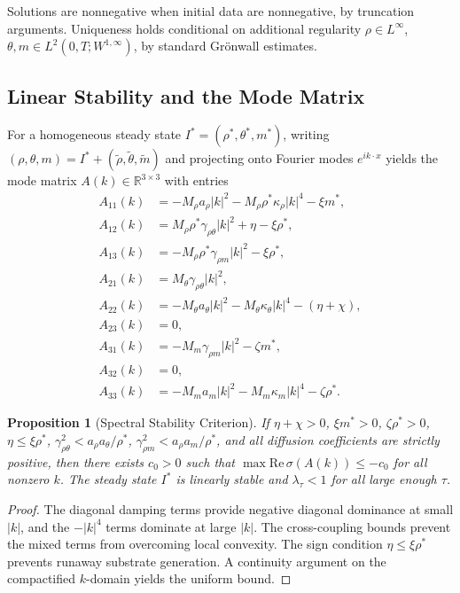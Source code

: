 \documentclass[10pt,twocolumn]{article}
\theoremstyle{plain}
\newtheorem{proposition}[theorem]{Proposition}
\theoremstyle{definition}
\theoremstyle{remark}
\begin{document}
Solutions are nonnegative when initial data are nonnegative, by
truncation arguments. Uniqueness holds conditional on additional
regularity $\rho \in L^\infty$, $\theta, m \in L^2(0,T;W^{1,\infty})$,
by standard Grönwall estimates.

\subsection{Linear Stability and the Mode Matrix}

For a homogeneous steady state $I^* = (\rho^*,\theta^*,m^*)$, writing
$(\rho,\theta,m) = I^* + (\tilde\rho,\tilde\theta,\tilde m)$
and projecting onto Fourier modes $e^{ik \cdot x}$ yields the mode matrix
$A(k) \in \mathbb{R}^{3\times 3}$ with entries
\begin{align*}
A_{11}(k) &= -M_\rho a_\rho|k|^2 - M_\rho\rho^*\kappa_\rho|k|^4 - \xi m^*, \\
A_{12}(k) &= M_\rho\rho^*\gamma_{\rho\theta}|k|^2 + \eta - \xi\rho^*, \\
A_{13}(k) &= -M_\rho\rho^*\gamma_{\rho m}|k|^2 - \xi\rho^*, \\
A_{21}(k) &= M_\theta\gamma_{\rho\theta}|k|^2, \\
A_{22}(k) &= -M_\theta a_\theta|k|^2 - M_\theta\kappa_\theta|k|^4 - (\eta+\chi), \\
A_{23}(k) &= 0, \\
A_{31}(k) &= -M_m\gamma_{\rho m}|k|^2 - \zeta m^*, \\
A_{32}(k) &= 0, \\
A_{33}(k) &= -M_m a_m|k|^2 - M_m\kappa_m|k|^4 - \zeta\rho^*.
\end{align*}

\begin{proposition}[Spectral Stability Criterion]
\label{prop:spectral}
If $\eta + \chi > 0$, $\xi m^* > 0$, $\zeta\rho^* > 0$,
$\eta \leq \xi\rho^*$, $\gamma_{\rho\theta}^2 < a_\rho a_\theta/\rho^*$,
$\gamma_{\rho m}^2 < a_\rho a_m/\rho^*$, and all diffusion coefficients
are strictly positive, then there exists $c_0 > 0$ such that
$\max \mathrm{Re}\,\sigma(A(k)) \leq -c_0$ for all nonzero $k$.
The steady state $I^*$ is linearly stable and $\lambda_\tau < 1$ for all
large enough $\tau$.
\end{proposition}

\begin{proof}
The diagonal damping terms provide negative diagonal dominance at small
$|k|$, and the $-|k|^4$ terms dominate at large $|k|$. The
cross-coupling bounds prevent the mixed terms from overcoming local
convexity. The sign condition $\eta \leq \xi\rho^*$ prevents runaway
substrate generation. A continuity argument on the compactified
$k$-domain yields the uniform bound.
\end{proof}
\end{document}

